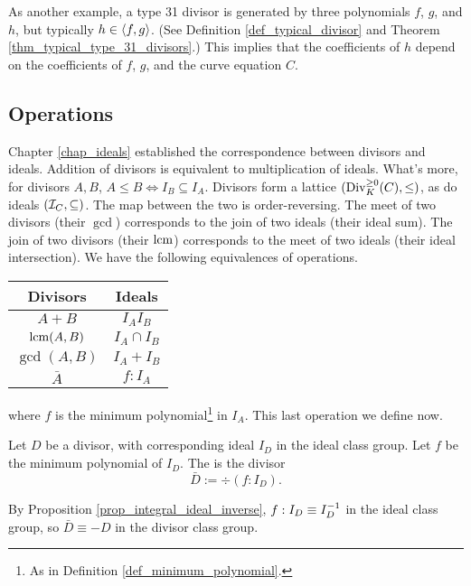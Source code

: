 As another example, a type 31 divisor is generated by three polynomials $f$, $g$, and $h$,
but typically $h \in \pid{f,g}$.
(See Definition \ref{def_typical_divisor} and Theorem \ref{thm_typical_type_31_divisors}.)
This implies that the coefficients of $h$ depend on the coefficients of $f$, $g$, and the curve equation $C$.




\subsection{Operations}

Chapter \ref{chap_ideals} established the correspondence between divisors and ideals.
Addition of divisors is equivalent to multiplication of ideals.
What's more, for divisors $A, B$, $A \leq B \iff I_B \subseteq I_A$.
Divisors form a lattice $(\Div_K^{\geq 0}(C), \leq)$, as do ideals $(\cal I_C, \subseteq)$.
The map between the two is order-reversing.
The meet of two divisors (their $\gcd$) corresponds to the join of two ideals (their ideal sum).
The join of two divisors (their $\lcm$) corresponds to the meet of two ideals (their ideal intersection).
We have the following equivalences of operations.
\begin{center}
  \begin{tabular}{c|c}
    Divisors & Ideals \\
    \hline
    $A + B$ & $I_A I_B$ \\
    $\lcm(A,B)$ & $I_A \cap I_B$ \\
    $\gcd(A,B)$ & $I_A + I_B$ \\
    $\bar A$ & $f : I_A$
  \end{tabular}
\end{center}
where $f$ is the minimum polynomial\footnote{As in Definition \ref{def_minimum_polynomial}.} in $I_A$.
This last operation we define now.
\begin{definition}
  \label{def_flip}
  Let $D$ be a divisor, with corresponding ideal $I_D$ in the ideal class group.
  Let $f$ be the minimum polynomial of $I_D$.
  The  is the divisor
  \[ \bar D := \div(f : I_D). \]
\end{definition}
By Proposition \ref{prop_integral_ideal_inverse}, $f : I_D \equiv I_D\inv$ in the ideal class group,
so $\bar D \equiv -D$ in the divisor class group.

